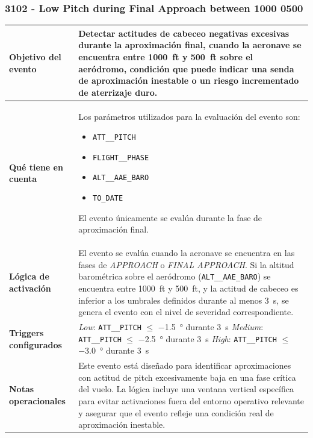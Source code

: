 \documentclass[11pt,a4paper]{article}
\begin{document}
	\subsubsection{3102 - Low Pitch during Final Approach between 1000 0500}
	
	\begin{longtable}{p{5cm} p{9.5cm}}
		\hline
		\textbf{Objetivo del evento} &
		Detectar actitudes de cabeceo negativas excesivas durante la aproximación final, cuando la aeronave se encuentra entre \SI{1000}{ft} y \SI{500}{ft} sobre el aeródromo, condición que puede indicar una senda de aproximación inestable o un riesgo incrementado de aterrizaje duro. \\
		\hline
		
		\textbf{Qué tiene en cuenta} &
		Los parámetros utilizados para la evaluación del evento son:
		\begin{itemize}
			\item \texttt{ATT\_\_PITCH}
			\item \texttt{FLIGHT\_\_PHASE}
			\item \texttt{ALT\_\_AAE\_BARO}
			\item \texttt{TO\_DATE}
		\end{itemize}
		El evento únicamente se evalúa durante la fase de aproximación final. \\
		\hline
		
		\textbf{Lógica de activación} &
		El evento se evalúa cuando la aeronave se encuentra en las fases de \textit{APPROACH} o \textit{FINAL APPROACH}.  
		Si la altitud barométrica sobre el aeródromo (\texttt{ALT\_\_AAE\_BARO}) se encuentra entre \SI{1000}{ft} y \SI{500}{ft}, y la actitud de cabeceo es inferior a los umbrales definidos durante al menos \SI{3}{s}, se genera el evento con el nivel de severidad correspondiente. \\
		\hline
		
		\textbf{Triggers configurados} &
		\textit{Low}: \texttt{ATT\_\_PITCH} $\leq$ \SI{-1.5}{\degree} durante \SI{3}{s} \newline
		\textit{Medium}: \texttt{ATT\_\_PITCH} $\leq$ \SI{-2.5}{\degree} durante \SI{3}{s} \newline
		\textit{High}: \texttt{ATT\_\_PITCH} $\leq$ \SI{-3.0}{\degree} durante \SI{3}{s} \\
		\hline
		
		\textbf{Notas operacionales} &
		Este evento está diseñado para identificar aproximaciones con actitud de pitch excesivamente baja en una fase crítica del vuelo.  
		La lógica incluye una ventana vertical específica para evitar activaciones fuera del entorno operativo relevante y asegurar que el evento refleje una condición real de aproximación inestable. \\
		\hline
	\end{longtable}
	
\end{document}
